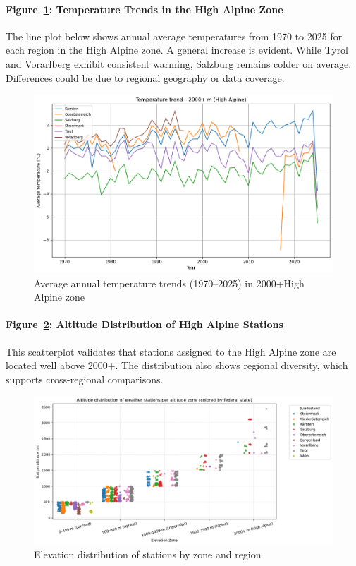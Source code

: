 \paragraph{Figure~\ref{fig:temptrend_highalpine}: Temperature Trends in the High Alpine Zone}
The line plot below shows annual average temperatures from 1970 to 2025 for each region in the High Alpine zone. A general increase is evident. While Tyrol and Vorarlberg exhibit consistent warming, Salzburg remains colder on average. Differences could be due to regional geography or data coverage.

\begin{figure}[htbp]
    \centering
    \includegraphics[width=\textwidth]{img/temptrend_highalpine.png}
    \caption{Average annual temperature trends (1970–2025) in 2000+\m High Alpine zone}
    \label{fig:temptrend_highalpine}
\end{figure}

\paragraph{Figure~\ref{fig:station_distribution_highalpine}: Altitude Distribution of High Alpine Stations}
This scatterplot validates that stations assigned to the High Alpine zone are located well above 2000+\m. The distribution also shows regional diversity, which supports cross-regional comparisons.

\begin{figure}[htbp]
    \centering
    \includegraphics[width=\textwidth]{img/station_distribution_highalpine.png}
    \caption{Elevation distribution of stations by zone and region}
    \label{fig:station_distribution_highalpine}
\end{figure}

